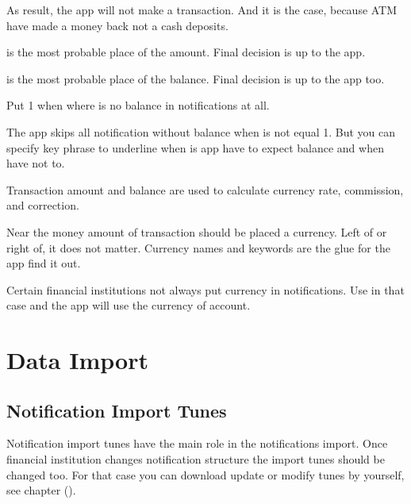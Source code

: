 \documentclass[a4paper,10pt,english]{sphinxmanual}
\begin{document}
\sphinxAtStartPar
As result, the app will not make a transaction. And it is the case, because ATM have made a money back not
a cash deposits.

\sphinxAtStartPar
{} is the most probable place of the amount. Final
decision is up to the app.

\sphinxAtStartPar
{} is the most probable place of the balance. Final
decision is up to the app too.

\sphinxAtStartPar
Put \sphinxhyphen{}1 when where is no balance in notifications at all.

\sphinxAtStartPar
The app skips all notification without balance when  is not equal \sphinxhyphen{}1.
But you can specify key phrase to underline when is app have to expect balance and when have not to.

\sphinxAtStartPar
Transaction amount and balance are used to calculate currency rate, commission, and correction.

\sphinxAtStartPar
Near the money amount of transaction should be placed a currency. Left of or right of, it does not matter.
Currency names and keywords are the glue for the app find it out.

\sphinxAtStartPar
Certain financial institutions not always put currency in notifications. Use
 in that case and the app will use the currency of account.

\sphinxstepscope


\chapter{Data Import}
\label{\detokenize{import:data-import}}\label{\detokenize{import:chapter-import}}\label{\detokenize{import::doc}}

\section{Notification Import Tunes}
\label{\detokenize{import:notification-import-tunes}}
\sphinxAtStartPar
Notification import tunes have the main role in the notifications import. Once
financial institution changes notification structure the import tunes should be changed too.
For that case you can download update or modify tunes by yourself, see chapter {\hyperref[\detokenize{notifications:chapter-notifications}]{}} ().
\end{document}
